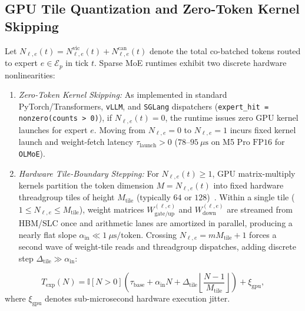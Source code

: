 \documentclass[final,5p,times,twocolumn]{elsarticle}
\theoremstyle{definition}
\theoremstyle{remark}
\begin{document}
\subsection{GPU Tile Quantization and Zero-Token Kernel Skipping}
Let $N_{\ell, e}(t) = N_{\ell, e}^{\mathrm{vic}}(t) + N_{\ell, e}^{\mathrm{can}}(t)$ denote the total co-batched tokens routed to expert $e \in \mathcal{E}_p$ in tick $t$. Sparse MoE runtimes exhibit two discrete hardware nonlinearities:
\begin{enumerate}
  \item \emph{Zero-Token Kernel Skipping:} As implemented in standard PyTorch/Transformers, \texttt{vLLM}, and \texttt{SGLang} dispatchers (\texttt{expert\_hit = nonzero(counts > 0)}), if $N_{\ell, e}(t) = 0$, the runtime issues zero GPU kernel launches for expert $e$. Moving from $N_{\ell, e} = 0$ to $N_{\ell, e} = 1$ incurs fixed kernel launch and weight-fetch latency $\tau_{\mathrm{launch}} > 0$ ($78$--$95~\mu\mathrm{s}$ on M5 Pro $\mathrm{FP16}$ for \texttt{OLMoE}).
  \item \emph{Hardware Tile-Boundary Stepping:} For $N_{\ell, e}(t) \ge 1$, GPU matrix-multiply kernels partition the token dimension $M = N_{\ell, e}(t)$ into fixed hardware threadgroup tiles of height $M_{\mathrm{tile}}$ (typically $64$ or $128$)~\cite{tan2025gpugemmcliff}. Within a single tile ($1 \le N_{\ell, e} \le M_{\mathrm{tile}}$), weight matrices $W_{\mathrm{gate/up}}^{(\ell, e)}$ and $W_{\mathrm{down}}^{(\ell, e)}$ are streamed from HBM/SLC once and arithmetic lanes are amortized in parallel, producing a nearly flat slope $\alpha_{\mathrm{in}} \ll 1~\mu\mathrm{s}/\text{token}$. Crossing $N_{\ell, e} = m M_{\mathrm{tile}} + 1$ forces a second wave of weight-tile reads and threadgroup dispatches, adding discrete step $\Delta_{\mathrm{tile}} \gg \alpha_{\mathrm{in}}$:
\end{enumerate}
\begin{equation}\label{eq:piecewise_latency}
  T_{\mathrm{exp}}(N) = \mathbb{I}[N > 0] \left( \tau_{\mathrm{base}} + \alpha_{\mathrm{in}} N + \Delta_{\mathrm{tile}} \left\lfloor \frac{N - 1}{M_{\mathrm{tile}}} \right\rfloor \right) + \xi_{\mathrm{gpu}},
\end{equation}
where $\xi_{\mathrm{gpu}}$ denotes sub-microsecond hardware execution jitter.
\end{document}
